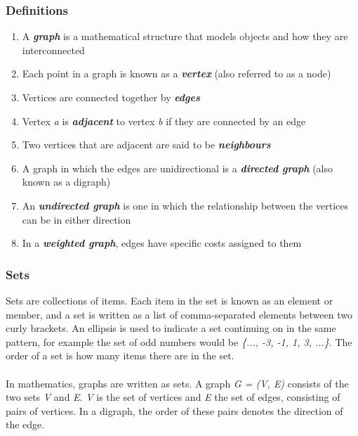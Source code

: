 \documentclass[titlepage]{article}
\begin{document}
\subsubsection{Definitions}
\begin{enumerate}
\item A \textit{\textbf{graph}} is a mathematical structure that models objects and how they are interconnected
\item Each point in a graph is known as a \textit{\textbf{vertex}} (also referred to as a node)
\item Vertices are connected together by \textit{\textbf{edges}}
\item Vertex \textit{a} is \textit{\textbf{adjacent}} to vertex \textit{b} if they are connected by an edge
\item Two vertices that are adjacent are said to be \textit{\textbf{neighbours}}
\item A graph in which the edges are unidirectional is a \textit{\textbf{directed graph}} (also known as a digraph)
\item An \textit{\textbf{undirected graph}} is one in which the relationship between the vertices can be in either direction
\item In a \textit{\textbf{weighted graph}}, edges have specific costs assigned to them
\end{enumerate}

\subsubsection{Sets}
Sets are collections of items. Each item in the set is known as an element or member, and a set is written as a list of comma-separated elements between two curly brackets. An ellipsis is used to indicate a set continuing on in the same pattern, for example the set of odd numbers would be  \textit{\{..., -3, -1, 1, 3, ...\}}. The order of a set is how many items there are in the set. \cite{setsbasics}
\\\\
In mathematics, graphs are written as sets. A graph \textit{G = (V, E)} consists of the two sets \textit{V} and \textit{E}. \textit{V} is the set of vertices and \textit{E} the set of edges, consisting of pairs of vertices. In a digraph, the order of these pairs denotes the direction of the edge. \cite{graphhandbook}
\end{document}
